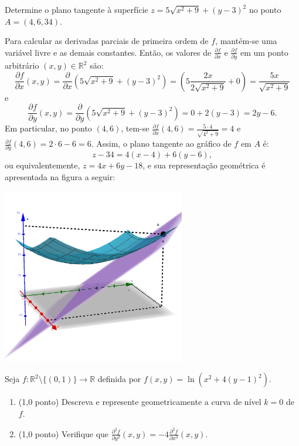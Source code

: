 \documentclass[12pt,a4paper]{article}
\begin{document}
\begin{ExerciseList}
\Exercise[title={2,0}] Determine o plano tangente à superfície $z = 5\sqrt{x^2 + 9} + (y - 3)^2$ no ponto $A=(4, 6, 34)$.

\Answer Para calcular as derivadas parciais de primeira ordem de $f$, mantém-se uma variável livre e as demais constantes. Então, os valores de $\frac{\partial f}{\partial x}$ e $\frac{\partial f}{\partial y}$ em um ponto arbitrário $(x,y)\in\mathbb{R}^2$ são:
\[
\frac{\partial f}{\partial x}(x, y)
= \frac{\partial}{\partial x}\left(5\sqrt{x^2 + 9} + (y - 3)^2\right)
= \left(5\frac{2x}{2\sqrt{x^2 + 9}} + 0\right)
= \frac{5x}{\sqrt{x^2 + 9}}
\]
e
\[
\frac{\partial f}{\partial y}(x, y)
= \frac{\partial}{\partial y}\left(5\sqrt{x^2 + 9} + (y - 3)^2\right)
= 0 + 2(y-3)
= 2y-6.
\]
Em particular, no ponto $(4, 6)$, tem-se $\frac{\partial f}{\partial x}(4, 6) = \frac{5\cdot 4}{\sqrt{4^2 + 9}} = 4$ e $\frac{\partial f}{\partial y}(4, 6) = 2\cdot 6-6 = 6$. Assim, o plano tangente ao gráfico de $f$ em $A$ é:
\[
z-34 = 4(x-4) + 6(y-6),
\]
ou equivalentemente, $z = 4 x + 6 y - 18$, e sua representação geométrica é apresentada na figura a seguir:

\begin{center}
\includegraphics[width=8.0cm]{img/prova-2-nex-plano-tangente.png}
\end{center}


\Exercise[title={2,0}] Seja $f: \mathbb{R}^2 \setminus\{(0, 1)\} \to \mathbb{R}$ definida por $f(x,y) = \ln\left(x^2 + 4(y-1)^2\right)$.
\begin{enumerate}
\item (1,0 ponto) Descreva e represente geometricamente a curva de nível $k=0$ de $f$.
\item (1,0 ponto) Verifique que $\frac{\partial^2 f}{\partial y^2}(x, y) = -4 \frac{\partial^2 f}{\partial x^2}(x, y)$.
\end{enumerate}


\end{ExerciseList}
\end{document}
